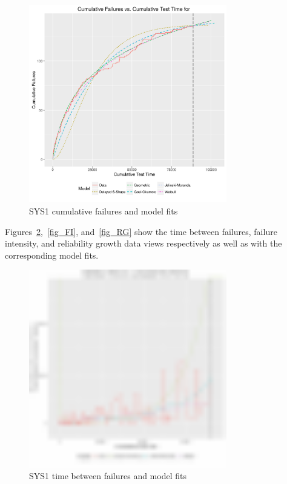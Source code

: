 \documentclass[journal]{IEEEtran}
\begin{document}
\begin{figure}[!h]
\centering
\includegraphics[width=3.4in]{Figures/SRT6}
\caption{SYS1 cumulative failures and model fits}
\label{fig_SYS1_Cum}
\end{figure}


Figures~\ref{fig_TBF},~\ref{fig_FI}, and~\ref{fig_RG} show the time between failures, failure intensity, and reliability growth data views respectively as well as with the corresponding model fits.

\begin{figure}[!h]
\centering
\includegraphics[width=3.4in]{Figures/TBF}
\caption{SYS1 time between failures and model fits}
\label{fig_TBF}
\end{figure}
\end{document}
